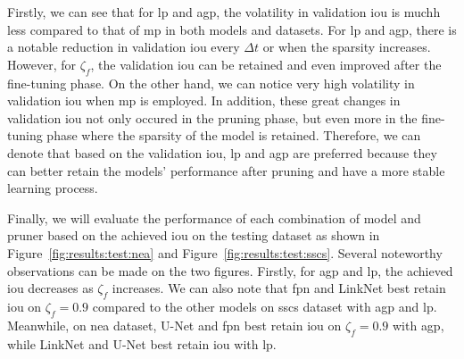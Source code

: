 \documentclass[mathematics,article,submit,pdftex,moreauthors]{Definitions/mdpi}
\begin{document}
Firstly, we can see that for \ac{lp} and \ac{agp},
the volatility in validation \ac{iou} is muchh less
compared to that of \ac{mp} in both models and datasets.
For \ac{lp} and \ac{agp}, there is a 
notable reduction in validation \ac{iou}
every $\Delta t$ or when the sparsity increases.
However, for $\zeta_f$, the validation \ac{iou}
can be retained and even improved after the fine-tuning phase.
On the other hand, we can notice very high volatility
in validation \ac{iou} when \ac{mp} is employed.
In addition, these great changes in validation \ac{iou}
not only occured in the pruning phase, but even more
in the fine-tuning phase where the sparsity
of the model is retained. Therefore, we
can denote that based on the validation \ac{iou},
\ac{lp} and \ac{agp} are preferred because they can
better retain the models' performance 
after pruning and have a more stable learning process.

Finally, we will evaluate the performance of
each combination of model and pruner based on
the achieved \ac{iou} on the testing dataset
as shown in Figure~\ref{fig:results:test:nea}
and Figure~\ref{fig:results:test:sscs}. Several
noteworthy observations can be made on the
two figures. Firstly, for \ac{agp} and \ac{lp},
the achieved \ac{iou} decreases as $\zeta_f$
increases. We can also note that
\ac{fpn} and LinkNet best retain \ac{iou}
on $\zeta_f=0.9$ compared to the other models
on \ac{sscs} dataset with \ac{agp} and \ac{lp}.
Meanwhile, on \ac{nea}
dataset, U-Net and \ac{fpn} best retain \ac{iou}
on $\zeta_f=0.9$ with \ac{agp}, while LinkNet and
U-Net best retain \ac{iou} with \ac{lp}.
\end{document}
